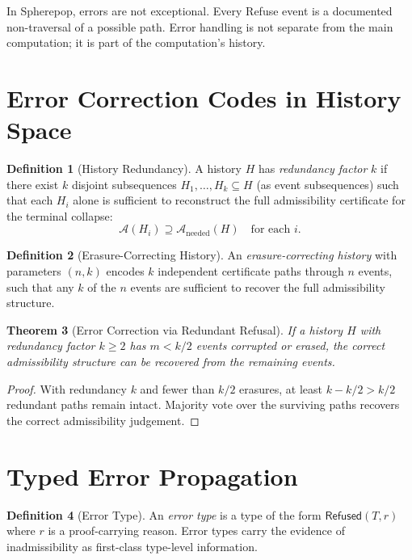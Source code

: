 \documentclass[12pt, a4paper, openany]{book}
\theoremstyle{plain}
\newtheorem{theorem}{Theorem}[chapter]
\theoremstyle{definition}
\newtheorem{definition}[theorem]{Definition}
\theoremstyle{remark}
\newcommand{\calA}{\mathcal{A}}
\newcommand{\Rfsd}{\mathsf{Refused}}
\begin{document}
In Spherepop, errors are not exceptional. Every Refuse event is a documented
non-traversal of a possible path. Error handling is not separate from the main
computation; it is part of the computation's history.

\section{Error Correction Codes in History Space}

\begin{definition}[History Redundancy]
A history $H$ has \emph{redundancy factor} $k$ if there exist $k$ disjoint
subsequences $H_1, \ldots, H_k \subseteq H$ (as event subsequences) such that
each $H_i$ alone is sufficient to reconstruct the full admissibility certificate
for the terminal collapse:
\[
\calA(H_i) \supseteq \calA_{\mathrm{needed}}(H) \quad \text{for each } i.
\]
\end{definition}

\begin{definition}[Erasure-Correcting History]
An \emph{erasure-correcting history} with parameters $(n, k)$ encodes $k$
independent certificate paths through $n$ events, such that any $k$ of the $n$
events are sufficient to recover the full admissibility structure.
\end{definition}

\begin{theorem}[Error Correction via Redundant Refusal]
If a history $H$ with redundancy factor $k \geq 2$ has $m < k/2$ events
corrupted or erased, the correct admissibility structure can be recovered from
the remaining events.
\end{theorem}

\begin{proof}
With redundancy $k$ and fewer than $k/2$ erasures, at least $k - k/2 > k/2$
redundant paths remain intact. Majority vote over the surviving paths recovers
the correct admissibility judgement.
\end{proof}

\section{Typed Error Propagation}

\begin{definition}[Error Type]
An \emph{error type} is a type of the form $\Rfsd(T, r)$ where $r$ is a
proof-carrying reason. Error types carry the evidence of inadmissibility as
first-class type-level information.
\end{definition}
\end{document}
